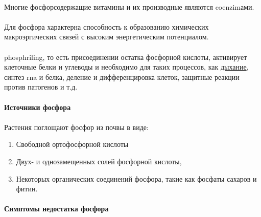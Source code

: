 \paragraph*{}Многие фосфорсодержащие витамины и их производные являются \gls{coenzim}ами.

\paragraph*{}Для фосфора характерна способность к образованию химических макроэргических связей с высоким энергетическим потенциалом. 

\paragraph*{}\gls{phosphriling}, то есть присоединении остатка фосфорной кислоты, активирует клеточные белки и углеводы и необходимо для таких процессов, как \hyperlink{sect_breazing}{дыхание}, синтез \gls{rna} и белка, деление и дифференцировка клеток, защитные реакции против патогенов и т.д.

\paragraph*{Источники фосфора}

\paragraph*{}Растения поглощают фосфор из почвы в виде:

\begin{enumerate}

\item Свободной ортофосфорной кислоты 
\item Двух- и однозамещенных солей фосфорной кислоты, 
\item Некоторых органических соединений фосфора, такие как фосфаты сахаров и фитин.

\end{enumerate}
  

\paragraph*{Симптомы недостатка фосфора}

